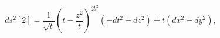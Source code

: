 \begin{equation}
  \label{eq:phi_2}
  ds^2[2]=\frac{1}{{\sqrt t}}
(t-\frac{z^2}{t})^{2 b^2}(-dt^2+dz^2)+t(dx^2+dy^2),
\end{equation}

